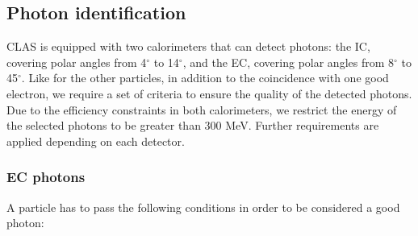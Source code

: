 \subsection{Photon identification}
CLAS is equipped with two calorimeters that can detect photons: the IC, covering polar angles from 4$^\circ$ to 14$^\circ$, and the EC, covering polar angles from 8$^\circ$ to 45$^\circ$. Like for the other particles, in addition to the coincidence with one good electron, we require a set of criteria to ensure the quality of the detected photons. Due to the efficiency constraints in both calorimeters, we restrict the energy of the selected photons to be greater than 300 MeV. Further requirements are applied depending on each detector.   

\subsubsection*{EC photons}
A particle has to pass the following conditions in order to be considered a good photon: 

